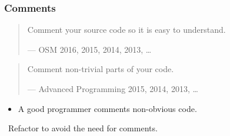 \begin{frame}

\frametitle{Comments}

\begin{quotation}

\footnotesize\sffamily\itshape

\begin{flushright}

Comment your source code so it is easy to understand.

\smallbreak

\upshape

--- OSM 2016, 2015, 2014, 2013, \ldots

\end{flushright}

\end{quotation}

\begin{quotation}

\footnotesize\sffamily\itshape

\begin{flushright}

Comment non-trivial parts of your code.

\smallbreak

\upshape

--- Advanced Programming 2015, 2014, 2013, \ldots

\end{flushright}

\end{quotation}

\begin{itemize}

\item A good programmer comments non-obvious code.

\end{itemize}

\vspace{\fill}

\begin{center}

\leftthumbsup~Refactor to avoid the need for comments.~\rightthumbsup

\end{center}

\vspace{\fill}

\end{frame}
